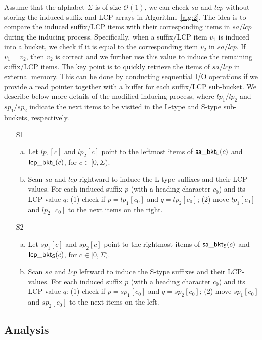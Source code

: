 \documentclass[10pt,journal,compsoc]{IEEEtran}
\begin{document}
Assume that the alphabet $\Sigma$ is of size $\mathcal{O}(1)$, we can check $sa$ and $lcp$ without storing the induced suffix and LCP arrays in Algorithm~\ref{alg:2}. The idea is to compare the induced suffix/LCP items with their corresponding items in $sa/lcp$ during the inducing process. Specifically, when a suffix/LCP item $v_1$ is induced into a bucket, we check if it is equal to the corresponding item $v_2$ in $sa/lcp$. If $v_1 = v_2$, then $v_2$ is correct and we further use this value to induce the remaining suffix/LCP items. The key point is to quickly retrieve the items of $sa/lcp$ in external memory. This can be done by conducting sequential I/O operations if we provide a read pointer together with a buffer for each suffix/LCP sub-bucket. We describe below more details of the modified inducing process, where $lp_1/lp_2$ and $sp_1/sp_2$ indicate the next items to be visited in the L-type and S-type sub-buckets, respectively.

\begin{enumerate}
	\item [S1]
	\begin{enumerate}[(a)]
		\item 
		Let $lp_1[c]$ and $lp_2[c]$ point to the leftmost items of ${\sf sa\_bkt_L}(c)$ and ${\sf lcp\_bkt_L}(c)$, for $c \in [0, \Sigma)$.
		\item 
		Scan $sa$ and $lcp$ rightward to induce the L-type suffixes and their LCP-values. For each induced suffix $p$ (with a heading character $c_0$) and its LCP-value $q$: (1) check if $p = lp_1[c_0]$ and $q = lp_2[c_0]$; (2) move $lp_1[c_0]$ and $lp_2[c_0]$ to the next items on the right.
	\end{enumerate}
	\item [S2]
	\begin{enumerate}[(a)]
		\item 	
		Let $sp_1[c]$ and $sp_2[c]$ point to the rightmost items of ${\sf sa\_bkt_S}(c)$ and ${\sf lcp\_bkt_S}(c)$, for $c \in [0, \Sigma)$.
		\item 	
		Scan $sa$ and $lcp$ leftward to induce the S-type suffixes and their LCP-values. For each induced suffix $p$ (with a heading character $c_0$) and its LCP-value $q$: (1) check if $p = sp_1[c_0]$ and $q = sp_2[c_0]$; (2) move $sp_1[c_0]$ and $sp_2[c_0]$ to the next items on the left.
	\end{enumerate}
\end{enumerate}

\subsection{Analysis} \label{sec:method2:analysis}
\end{document}
